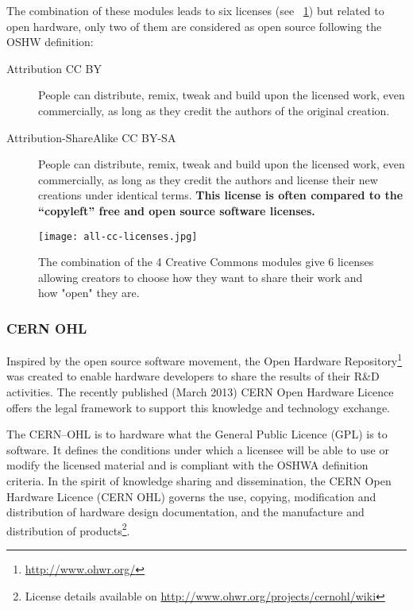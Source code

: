 The combination of these modules leads to six licenses (see \figurename~\ref{fig:all-cc-licenses}) but related to open hardware, only two of them are considered as open source following the OSHW definition:
\begin{description}
    \item[Attribution CC BY] People can distribute, remix, tweak and build upon the licensed work, even commercially, as long as they credit the authors of the original creation.
    \item[Attribution-ShareAlike CC BY-SA] People can distribute, remix, tweak and build upon the licensed work, even commercially, as long as they credit the authors and license their new creations under identical terms. \textbf{This license is often compared to the “copyleft” free and open source software licenses.}
\end{description}

\begin{figure}[tb]
    \begin{center}
        \texttt{[image: all-cc-licenses.jpg]}
    \end{center}
    \caption{The combination of the 4 Creative Commons modules give 6 licenses allowing creators to choose how they want to share their work and how "open" they are.}
    \label{fig:all-cc-licenses}
\end{figure}

\subsubsection{CERN OHL} %

Inspired by the open source software movement, the Open Hardware Repository\footnote{\url{http://www.ohwr.org/}} was created to enable hardware developers to share the results of their R\&D activities. The recently published (March 2013) CERN Open Hardware Licence offers the legal framework to support this knowledge and technology exchange.

The CERN–OHL is to hardware what the General Public Licence (GPL) is to software. It defines the conditions under which a licensee will be able to use or modify the licensed material and is compliant with the OSHWA definition criteria. In the spirit of knowledge sharing and dissemination, the CERN Open Hardware Licence (CERN OHL) governs the use, copying, modification and distribution of hardware design documentation, and the manufacture and distribution of products\footnote{License details available on \url{http://www.ohwr.org/projects/cernohl/wiki}}.


